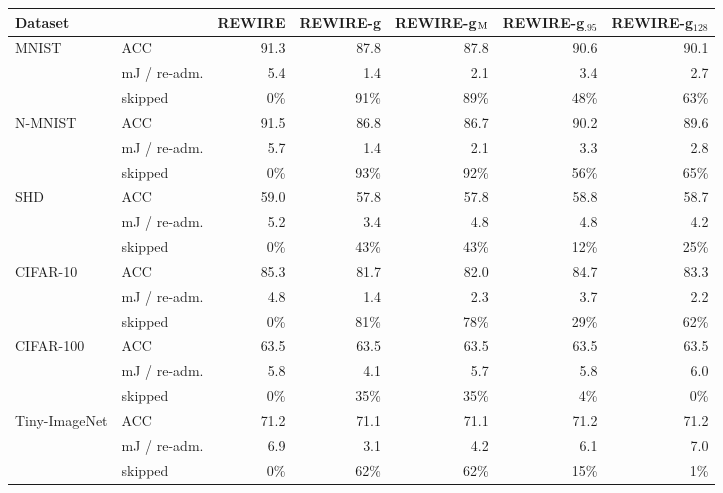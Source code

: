 \begin{tabular}{llrrrrr}
\toprule
Dataset & & REWIRE & REWIRE-g & REWIRE-g$_{\rm M}$ & REWIRE-g$_{.95}$ & REWIRE-g$_{128}$ \\
\midrule
MNIST & ACC & 91.3 & 87.8 & 87.8 & 90.6 & 90.1 \\
 & mJ / re-adm. & 5.4 & 1.4 & 2.1 & 3.4 & 2.7 \\
 & skipped & 0\% & 91\% & 89\% & 48\% & 63\% \\
N-MNIST & ACC & 91.5 & 86.8 & 86.7 & 90.2 & 89.6 \\
 & mJ / re-adm. & 5.7 & 1.4 & 2.1 & 3.3 & 2.8 \\
 & skipped & 0\% & 93\% & 92\% & 56\% & 65\% \\
SHD & ACC & 59.0 & 57.8 & 57.8 & 58.8 & 58.7 \\
 & mJ / re-adm. & 5.2 & 3.4 & 4.8 & 4.8 & 4.2 \\
 & skipped & 0\% & 43\% & 43\% & 12\% & 25\% \\
CIFAR-10 & ACC & 85.3 & 81.7 & 82.0 & 84.7 & 83.3 \\
 & mJ / re-adm. & 4.8 & 1.4 & 2.3 & 3.7 & 2.2 \\
 & skipped & 0\% & 81\% & 78\% & 29\% & 62\% \\
CIFAR-100 & ACC & 63.5 & 63.5 & 63.5 & 63.5 & 63.5 \\
 & mJ / re-adm. & 5.8 & 4.1 & 5.7 & 5.8 & 6.0 \\
 & skipped & 0\% & 35\% & 35\% & 4\% & 0\% \\
Tiny-ImageNet & ACC & 71.2 & 71.1 & 71.1 & 71.2 & 71.2 \\
 & mJ / re-adm. & 6.9 & 3.1 & 4.2 & 6.1 & 7.0 \\
 & skipped & 0\% & 62\% & 62\% & 15\% & 1\% \\
\bottomrule
\end{tabular}
